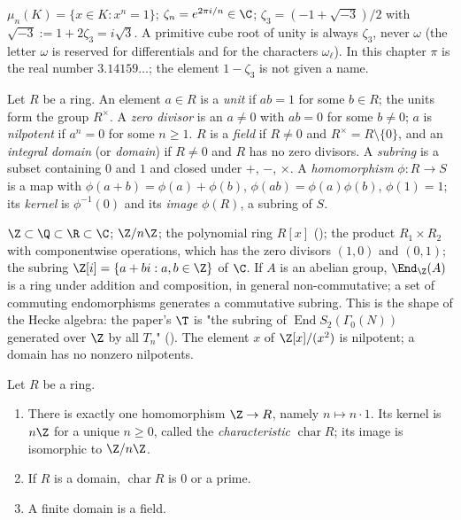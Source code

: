 \begin{convention}\label{conv:rings:roots}
$\mu_n(K)=\{x\in K:x^n=1\}$; $\zeta_n=e^{2\pi i/n}\in\C$; $\zeta_3=(-1+\sqrt{-3})/2$ with $\sqrt{-3}:=1+2\zeta_3=i\sqrt3$. A primitive cube
root of unity is always $\zeta_3$, never $\omega$ (the letter $\omega$ is reserved for differentials and for the
characters $\omega_\ell$). In this chapter $\pi$ is the real number $3.14159\ldots$; the element $1-\zeta_3$ is not given a name.
\end{convention}

\begin{definition}\label{def:rings:ring}
Let $R$ be a ring. An element $a\in R$ is a \emph{unit} if $ab=1$ for some $b\in R$; the units form the group $R^\times$. A
\emph{zero divisor} is an $a\ne0$ with $ab=0$ for some $b\ne0$; $a$ is \emph{nilpotent} if $a^n=0$ for some $n\ge1$. $R$ is a
\emph{field} if $R\ne0$ and $R^\times=R\setminus\{0\}$, and an \emph{integral domain} (or \emph{domain}) if $R\ne0$ and $R$ has no zero divisors.
A \emph{subring} is a subset containing $0$ and $1$ and closed under $+$, $-$, $\times$. A \emph{homomorphism} $\phi\colon R\to S$ is a
map with $\phi(a+b)=\phi(a)+\phi(b)$, $\phi(ab)=\phi(a)\phi(b)$, $\phi(1)=1$; its \emph{kernel} is $\phi^{-1}(0)$ and its \emph{image}
$\phi(R)$, a subring of $S$.
\end{definition}

\begin{example}\label{ex:rings:rings}
$\Z\subset\Q\subset\R\subset\C$; $\Z/n\Z$; the polynomial ring $R[x]$ (); the product $R_1\times R_2$ with
componentwise operations, which has the zero divisors $(1,0)$ and $(0,1)$; the subring $\Z[i]=\{a+bi:a,b\in\Z\}$ of $\C$. If $A$
is an abelian group, $\End_\Z(A)$ is a ring under addition and composition, in general non-commutative; a set of
commuting endomorphisms generates a commutative subring. This is the shape of the Hecke algebra: the paper's $\T$ is
"the subring of $\operatorname{End}S_2(\Gamma_0(N))$ generated over $\Z$ by all $T_n$" (). The element $x$ of $\Z[x]/(x^2)$ is
nilpotent; a domain has no nonzero nilpotents.
\end{example}

\begin{proposition}\label{prop:rings:characteristic}
Let $R$ be a ring.
\begin{enumerate}[label=(\roman*)]
\item There is exactly one homomorphism $\Z\to R$, namely $n\mapsto n\cdot1$. Its kernel is $n\Z$ for a unique $n\ge0$, called the
\emph{characteristic} $\operatorname{char}R$; its image is isomorphic to $\Z/n\Z$.
\item If $R$ is a domain, $\operatorname{char}R$ is $0$ or a prime.
\item A finite domain is a field.
\end{enumerate}
\end{proposition}

